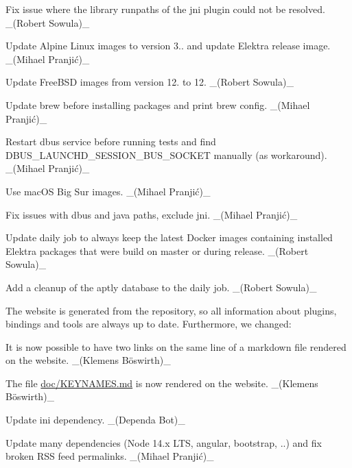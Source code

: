 \begin{DoxyItemize}
\item Fix issue where the library runpaths of the jni plugin could not be resolved. \+\_\+(\+Robert Sowula)\+\_\+
\end{DoxyItemize}


\begin{DoxyItemize}
\item Update Alpine Linux images to version 3.. and update Elektra release image. \+\_\+(Mihael Pranjić)\+\_\+
\end{DoxyItemize}


\begin{DoxyItemize}
\item Update Free\+B\+SD images from version 12. to 12. \+\_\+(\+Robert Sowula)\+\_\+
\item Update brew before installing packages and print brew config. \+\_\+(Mihael Pranjić)\+\_\+
\item Restart {\ttfamily dbus} service before running tests and find {\ttfamily D\+B\+U\+S\+\_\+\+L\+A\+U\+N\+C\+H\+D\+\_\+\+S\+E\+S\+S\+I\+O\+N\+\_\+\+B\+U\+S\+\_\+\+S\+O\+C\+K\+ET} manually (as workaround). \+\_\+(Mihael Pranjić)\+\_\+
\item Use mac\+OS Big Sur images. \+\_\+(Mihael Pranjić)\+\_\+
\end{DoxyItemize}


\begin{DoxyItemize}
\item Fix issues with {\ttfamily dbus} and java paths, exclude {\ttfamily jni}. \+\_\+(Mihael Pranjić)\+\_\+
\end{DoxyItemize}


\begin{DoxyItemize}
\item Update daily job to always keep the latest Docker images containing installed Elektra packages that were build on master or during release. \+\_\+(\+Robert Sowula)\+\_\+
\item Add a cleanup of the aptly database to the daily job. \+\_\+(\+Robert Sowula)\+\_\+
\end{DoxyItemize}

The website is generated from the repository, so all information about plugins, bindings and tools are always up to date. Furthermore, we changed\+:


\begin{DoxyItemize}
\item It is now possible to have two links on the same line of a markdown file rendered on the website. \+\_\+(Klemens Böswirth)\+\_\+
\item The file \hyperlink{doc_KEYNAMES_md}{doc/\+K\+E\+Y\+N\+A\+M\+ES.md} is now rendered on the website. \+\_\+(Klemens Böswirth)\+\_\+
\item Update {\ttfamily ini} dependency. \+\_\+(\+Dependa Bot)\+\_\+
\item Update many dependencies (Node 14.\+x L\+TS, angular, bootstrap, ..) and fix broken R\+SS feed permalinks. \+\_\+(Mihael Pranjić)\+\_\+
\end{DoxyItemize}

